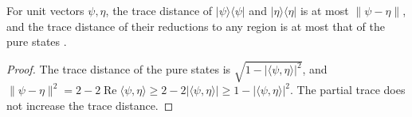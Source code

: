 \begin{theorem}
    \label{thm:finite_product_reduced_trace_distance}
    \leanok
    For unit vectors $\psi,\eta$, the trace distance of
    $\lvert\psi\rangle\langle\psi\rvert$ and $\lvert\eta\rangle\langle\eta\rvert$
    is at most $\lVert\psi-\eta\rVert$, and the trace distance of their reductions
    to any region is at most that of the pure states
    \cite[Section~2]{OpenAI2026AreaLaw}.
\end{theorem}
\begin{proof}\leanok
    The trace distance of the pure states is
    $\sqrt{1-\lvert\langle\psi,\eta\rangle\rvert^2}$, and
    $\lVert\psi-\eta\rVert^2=2-2\operatorname{Re}\langle\psi,\eta\rangle
    \ge2-2\lvert\langle\psi,\eta\rangle\rvert\ge1-\lvert\langle\psi,\eta\rangle\rvert^2$.
    The partial trace does not increase the trace distance.
\end{proof}

